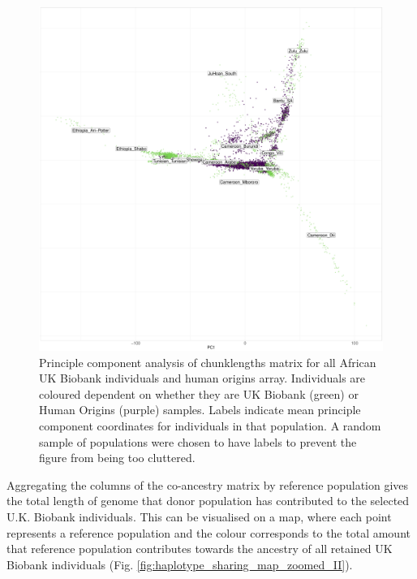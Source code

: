 \begin{figure}[htp]
    \centering
    \includegraphics[width=1.0\textwidth]{../images/chapter3/ChromoPainter_PCA_UKB_HO.pdf}
    \caption{Principle component analysis of chunklengths matrix for all African UK Biobank individuals and human origins array. Individuals are coloured dependent on whether they are UK Biobank (green) or Human Origins (purple) samples. Labels indicate mean principle component coordinates for individuals in that population. A random sample of populations were chosen to have labels to prevent the figure from being too cluttered.}
    \label{fig:PCA_chunklengths_HumanOrigins_UKBiobank}
\end{figure}

Aggregating the columns of the co-ancestry matrix by reference population gives the total length of genome that donor population has contributed to the selected U.K. Biobank individuals. This can be visualised on a map, where each point represents a reference population and the colour corresponds to the total amount that reference population contributes towards the ancestry of all retained UK Biobank individuals (Fig. \ref{fig:haplotype_sharing_map_zoomed_II}). 

